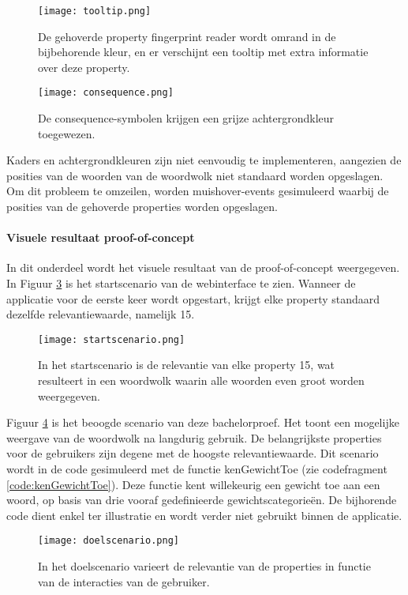\begin{figure}
    \centering
    \texttt{[image: tooltip.png]}
    \caption[Styling bij het hoveren]{\label{fig:tooltip}De gehoverde property fingerprint reader wordt omrand in de bijbehorende kleur, en er verschijnt een tooltip met extra informatie over deze property.}
\end{figure}
\begin{figure}
    \centering
    \texttt{[image: consequence.png]}
    \caption[Consequence-symbmolen]{\label{fig:consequence}De consequence-symbolen krijgen een grijze achtergrondkleur toegewezen.}
\end{figure}
\medskip\par Kaders en achtergrondkleuren zijn niet eenvoudig te implementeren, aangezien de posities van de woorden van de woordwolk niet standaard worden opgeslagen. Om dit probleem te omzeilen, worden muishover-events gesimuleerd waarbij de posities van de gehoverde properties worden opgeslagen.

\paragraph{Visuele resultaat proof-of-concept}
In dit onderdeel wordt het visuele resultaat van de proof-of-concept weergegeven. In Figuur \ref{fig:startscenario} is het startscenario van de webinterface te zien. Wanneer de applicatie voor de eerste keer wordt opgestart, krijgt elke property standaard dezelfde relevantiewaarde, namelijk 15.
\begin{figure}
    \centering
    \texttt{[image: startscenario.png]}
    \caption[Startscenario webinterface]{\label{fig:startscenario}In het startscenario is de relevantie van elke property 15, wat resulteert in een woordwolk waarin alle woorden even groot worden weergegeven.}
\end{figure}
Figuur \ref{fig:doelscenario} is het beoogde scenario van deze bachelorproef. Het toont een mogelijke weergave van de woordwolk na langdurig gebruik. De belangrijkste properties voor de gebruikers zijn degene met de hoogste relevantiewaarde. Dit scenario wordt in de code gesimuleerd met de functie kenGewichtToe (zie codefragment \ref{code:kenGewichtToe}). Deze functie kent willekeurig een gewicht toe aan een woord, op basis van drie vooraf gedefinieerde gewichtscategorieën. De bijhorende code dient enkel ter illustratie en wordt verder niet gebruikt binnen de applicatie.
\begin{figure}
    \centering
    \texttt{[image: doelscenario.png]}
    \caption[Doelscenario webinterface]{\label{fig:doelscenario}In het doelscenario varieert de relevantie van de properties in functie van de interacties van de gebruiker.}
\end{figure}

